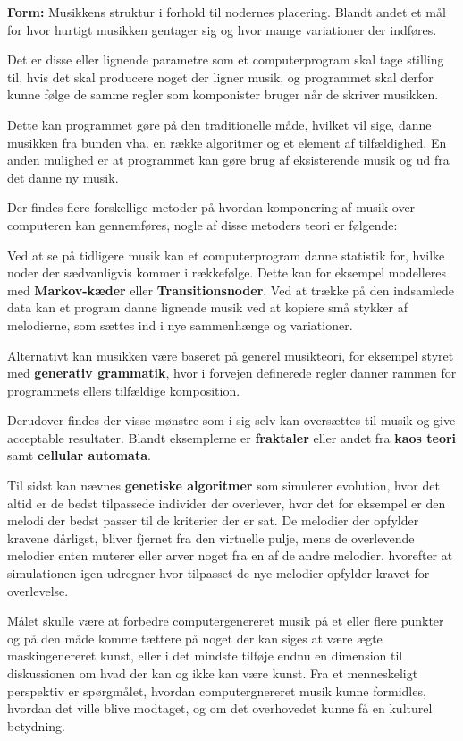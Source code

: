 \documentclass[12pt]{Article}
\begin{document}
\textbf{Form:} Musikkens struktur i forhold til nodernes placering. Blandt andet et mål for hvor hurtigt musikken gentager sig og hvor mange variationer der indføres.

Det er disse eller lignende parametre som et computerprogram skal tage stilling til, hvis det skal producere noget der ligner musik, og programmet skal derfor kunne følge de samme regler som komponister bruger når de skriver musikken.



Dette kan programmet gøre på den traditionelle måde, hvilket vil sige, danne musikken fra bunden vha. en række algoritmer og et element af tilfældighed. En anden mulighed er at programmet kan gøre brug af eksisterende musik og ud fra det danne ny musik.

Der findes flere forskellige metoder på hvordan komponering af musik over computeren kan gennemføres, nogle af disse metoders teori er følgende:

Ved at se på tidligere musik kan et computerprogram danne statistik for, hvilke noder der sædvanligvis kommer i rækkefølge. Dette kan for eksempel modelleres med \textbf{Markov-kæder} eller \textbf{Transitionsnoder}. Ved at trække på den indsamlede data kan et program danne lignende musik ved at kopiere små stykker af melodierne, som sættes ind i nye sammenhænge og variationer.

Alternativt kan musikken være baseret på generel musikteori, for eksempel styret med \textbf{generativ grammatik}, hvor i forvejen definerede regler danner rammen for programmets ellers tilfældige komposition.

Derudover findes der visse mønstre som i sig selv kan oversættes til musik og give acceptable resultater. Blandt eksemplerne er \textbf{fraktaler} eller andet fra \textbf{kaos teori }samt \textbf{cellular automata}.

Til sidst kan nævnes \textbf{genetiske algoritmer }som simulerer evolution, hvor det altid er de bedst tilpassede individer der overlever, hvor det for eksempel er den melodi der bedst passer til de kriterier der er sat. De melodier der opfylder kravene dårligst, bliver fjernet fra den virtuelle pulje, mens de overlevende melodier enten  muterer eller arver noget fra en af de andre melodier. hvorefter at simulationen igen udregner hvor tilpasset de nye melodier opfylder kravet for overlevelse. 



Målet skulle være at forbedre computergenereret musik på et eller flere punkter og på den måde komme tættere på noget der kan siges at være ægte maskingenereret kunst, eller i det mindste tilføje endnu en dimension til diskussionen om hvad der kan og ikke kan være kunst. Fra et menneskeligt perspektiv er spørgmålet, hvordan computergnereret musik kunne formidles, hvordan det ville blive modtaget, og om det overhovedet kunne få en kulturel betydning.
\end{document}
